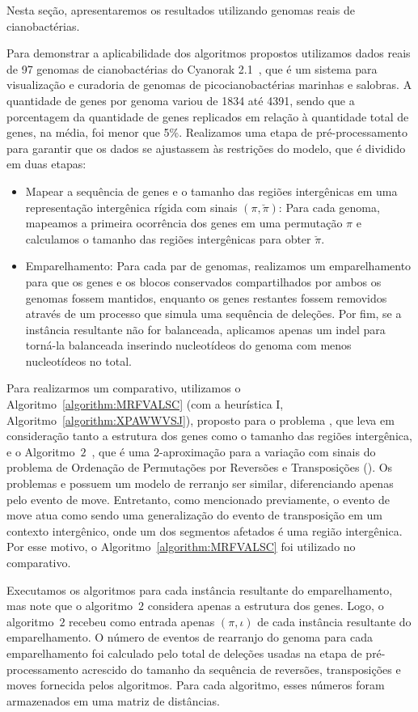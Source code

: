 Nesta seção, apresentaremos os resultados utilizando genomas reais de cianobactérias.

Para demonstrar a aplicabilidade dos algoritmos propostos utilizamos dados reais de 97 genomas de cianobactérias do Cyanorak 2.1~\cite{cyanorak}, que é um sistema para visualização e curadoria de genomas de picocianobactérias marinhas e salobras. A quantidade de genes por genoma variou de 1834 até 4391, sendo que a porcentagem da quantidade de genes replicados em relação à quantidade total de genes, na média, foi menor que 5\%. Realizamos uma etapa de pré-processamento para garantir que os dados se ajustassem às restrições do modelo, que é dividido em duas etapas:
\begin{itemize}
  \item Mapear a sequência de genes e o tamanho das regiões intergênicas em uma representação intergênica rígida com sinais $(\pi,\breve\pi)$: Para cada genoma, mapeamos a primeira ocorrência dos genes em uma permutação $\pi$ e calculamos o tamanho das regiões intergênicas para obter $\breve\pi$.
  \item Emparelhamento: Para cada par de genomas, realizamos um emparelhamento para que os genes e os blocos conservados compartilhados por ambos os genomas fossem mantidos, enquanto os genes restantes fossem removidos através de um processo que simula uma sequência de deleções. Por fim, se a instância resultante não for balanceada, aplicamos apenas um indel para torná-la balanceada inserindo nucleotídeos do genoma com menos nucleotídeos no total.
\end{itemize}

Para realizarmos um comparativo, utilizamos o Algoritmo~\ref{algorithm:MRFVALSC} (com a heurística I, Algoritmo~\ref{algorithm:XPAWWVSJ}), proposto para o problema \SbIRTM{}, que leva em consideração tanto a estrutura dos genes como o tamanho das regiões intergênica, e o Algoritmo~$2$\SbRT{}~\cite{1998-walter-etal}, que é uma $2$-aproximação para a variação com sinais do problema de Ordenação de Permutações por Reversões e Transposições (\SbRT). Os problemas \SbIRTM{} e \SbRT{} possuem um modelo de rerranjo ser similar, diferenciando apenas pelo evento de move. Entretanto, como mencionado previamente, o evento de move atua como sendo uma generalização do evento de transposição em um contexto intergênico, onde um dos segmentos afetados é uma região intergênica. Por esse motivo, o Algoritmo~\ref{algorithm:MRFVALSC} foi utilizado no comparativo. 

Executamos os algoritmos para cada instância resultante do emparelhamento, mas note que o algoritmo~$2$\SbRT{} considera apenas a estrutura dos genes. Logo, o algoritmo~$2$\SbRT{} recebeu como entrada apenas $(\pi,\iota)$ de cada instância resultante do emparelhamento. O número de eventos de rearranjo do genoma para cada emparelhamento foi calculado pelo total de deleções usadas na etapa de pré-processamento acrescido do tamanho da sequência de reversões, transposições e moves fornecida pelos algoritmos. Para cada algoritmo, esses números foram armazenados em uma matriz de distâncias.


